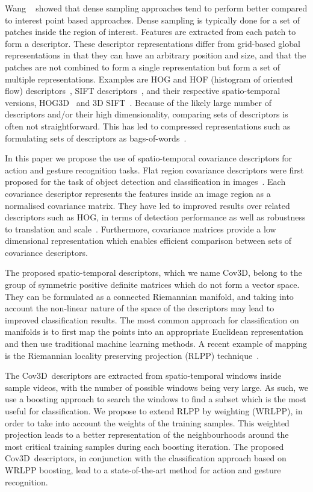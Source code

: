 \documentclass[10pt,twocolumn,letterpaper]{article}
\newcommand{\cov}{{Cov3D}}
\begin{document}
Wang \etal~\cite{WangEtAl2009} showed that dense sampling approaches tend to perform better compared to interest point based approaches. Dense
sampling is typically done for a set of patches inside the region of interest. Features are extracted from each patch to form a descriptor. These
descriptor representations differ from grid-based global representations in that they can have an arbitrary position and size, and that the patches
are not combined to form a single representation but form a set of multiple representations.
Examples are HOG and HOF (histogram of oriented flow) descriptors~\cite{LaptevEtAl2008},
SIFT descriptors~\cite{Lowe2004},
and their respective spatio-temporal versions, HOG3D~\cite{WangEtAl2009} and 3D SIFT~\cite{ScovannerEtAl2007}.
Because of the likely large number of descriptors and/or their high dimensionality, comparing sets of
descriptors is often not straightforward.
This has led to compressed representations such as formulating sets of descriptors as bags-of-words~\cite{NieblesEtAl2008}.

In this paper we propose the use of spatio-temporal covariance descriptors for action and gesture recognition tasks.
Flat region covariance descriptors were first proposed for the task of object detection and classification in images~\cite{TuzelEtAl2008}.
Each covariance descriptor represents the features inside an image region as a normalised covariance matrix.
They have led to improved results over related descriptors such as HOG,
in terms of detection performance as well as robustness to translation and scale~\cite{TuzelEtAl2008}.
Furthermore, covariance matrices provide a low dimensional representation
which enables efficient comparison between sets of covariance descriptors.

The proposed spatio-temporal descriptors, which we name \cov,
belong to the group of symmetric positive definite matrices which do not form a vector space.
They can be formulated as a connected Riemannian manifold,
and taking into account the non-linear nature of the space of the descriptors may lead to improved classification results.
The most common approach for classification on manifolds is to first map the points
into an appropriate Euclidean representation~\cite{LinAndZha2008}
and then use traditional machine learning methods. 
A recent example of mapping is the Riemannian locality preserving projection (RLPP) technique~\cite{HarandiEtAl2012}.

The \cov~descriptors are extracted from spatio-temporal windows inside sample videos,
with the number of possible windows being very large.
As such, we use a boosting approach to search the windows to find a subset which is the most useful for classification.
We propose to extend RLPP by weighting (WRLPP), in order to take into account the weights of the training samples.
This weighted projection leads to a better representation of the neighbourhoods around the most critical training samples during each boosting iteration.
The proposed \cov~descriptors, in conjunction with the classification approach based on WRLPP boosting,
lead to a state-of-the-art method for action and gesture recognition.
\end{document}

